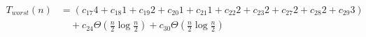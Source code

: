 \begin{align}
\label{eq:analyse-checksquare-vertex}
T_{worst}(n)& =
(c_{17}4 + c_{18}1 + c_{19}2 + c_{20}1 + c_{21}1 + c_{22}2 + c_{23}2 + c_{27}2 + c_{28}2 + c_{29}3)
\\
& \quad
+ c_{24}\Theta(\frac{n}{2} \log \frac{n}{2})
+ c_{30}\Theta(\frac{n}{2} \log \frac{n}{2})
\nonumber
\end{align}
